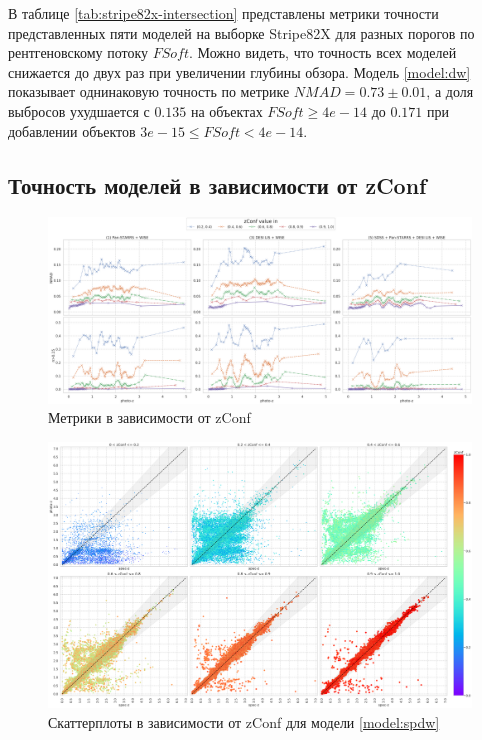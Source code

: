 \documentclass[fleqn,usenatbib]{mnras}
\begin{document}
В таблице \ref{tab:stripe82x-intersection} представлены метрики точности представленных пяти моделей на выборке Stripe82X для разных порогов по рентгеновскому потоку $FSoft$. Можно видеть, что точность всех моделей снижается до двух раз при увеличении глубины обзора. Модель \ref{model:dw} показывает однинаковую точность по метрике $NMAD = 0.73 \pm 0.01$, а доля выбросов ухудшается с $0.135$ на объектах $FSoft \geq 4e-14$ до $0.171$ при добавлении объектов $3e-15 \leq FSoft < 4e-14$.

\subsection{Точность моделей в зависимости от zConf}

\begin{figure}
    \centering
    \includegraphics[width=0.9\linewidth]{images/metrics-zconf-cv2.png}
    \caption{Метрики в зависимости от zConf}
    \label{fig:metrics-zconf-cv2}
\end{figure}

\begin{figure}
    \centering
    \includegraphics[width=0.9\linewidth]{images/zconf-scatterplot-35.png}
    \caption{Скаттерплоты в зависимости от zConf для модели \ref{model:spdw}}
    \label{fig:zconf-scatterplot-35}
\end{figure}
\end{document}
